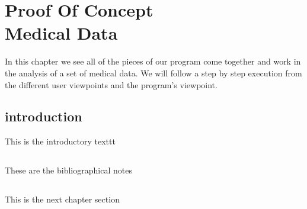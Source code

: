 %
%

\chapter{Proof Of Concept \\Medical Data}

\begin{resumen}
In this chapter we see all of the pieces of our program come together and work in the analysis of a set of medical data.
We will follow a step by step execution from the different user viewpoints and the program's viewpoint.
\end{resumen}

\section{introduction}
\label{cap1:sec:introduccion}

This is the introductory texttt

\section*{\NotasBibliograficas}
\TocNotasBibliograficas

These are the bibliographical notes
\citep{ldesc2e}

\medskip



\section*{\ProximoCapitulo}
\TocProximoCapitulo

This is the next chapter section


